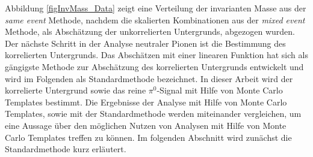 \newline
Abbildung \ref{figInvMass_Data} zeigt eine Verteilung der invarianten Masse aus der \textit{same event} Methode, nachdem die skalierten Kombinationen aus der \textit{mixed event} Methode, als Abschätzung der unkorrelierten Untergrunds, abgezogen wurden.
\newline
Der nächste Schritt in der Analyse neutraler Pionen ist die Bestimmung des korrelierten Untergrunds.
Das Abschätzen mit einer linearen Funktion hat sich als gängigste Methode zur Abschätzung des korrelierten Untergrunds entwickelt und wird im Folgenden als Standardmethode bezeichnet.
In dieser Arbeit wird der korrelierte Untergrund sowie das reine $\pi^{0}$-Signal mit Hilfe von Monte Carlo Templates bestimmt.
Die Ergebnisse der Analyse mit Hilfe von Monte Carlo Templates, sowie mit der Standardmethode werden miteinander vergleichen, um eine Aussage über den möglichen Nutzen von Analysen mit Hilfe von Monte Carlo Templates treffen zu können.
Im folgenden Abschnitt wird zunächst die Standardmethode kurz erläutert.
